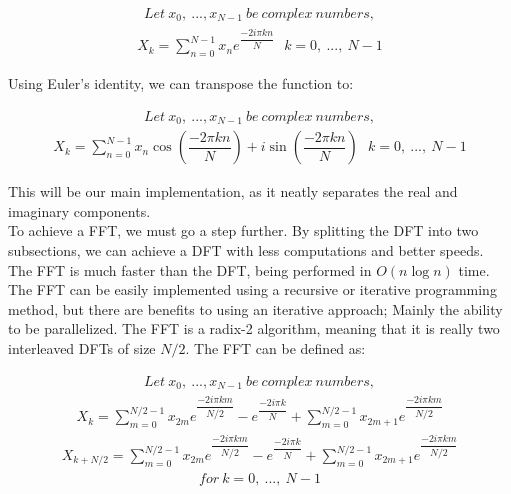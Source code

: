 \documentclass[12pt]{extarticle}
\begin{document}
	\begin{align*}
		Let\ x_{0},\ ..., x_{N-1}\ be\ complex\ numbers,
	\end{align*}
	\begin{align}
		X_{k} = \sum_{n=0}^{N-1}x_{n}e^{\dfrac{-2 i \pi k n}{N}}\ \ \ k = 0,\ ...,\ N-1
    \end{align}
   
	Using Euler's identity, we can transpose the function to:
	
	\begin{align*}
		Let\ x_{0},\ ..., x_{N-1}\ be\ complex\ numbers,
	\end{align*}
	\begin{align}
		X_{k} = \sum_{n=0}^{N-1}x_{n} \cos{(\dfrac{-2 \pi k n}{N})} + i\sin{(\dfrac{-2 \pi k n}{N})}\ \ \ k = 0,\ ...,\ N-1
    \end{align}
    
    This will be our main implementation, as it neatly separates the real and imaginary components.
   \\
   
   	To achieve a FFT, we must go a step further.
   	By splitting the DFT into two subsections, we can achieve a DFT with less computations and better speeds.
	The FFT is much faster than the DFT, being performed in $O(n\log{}n)$ time.
	The FFT can be easily implemented using a recursive or iterative programming method, but there are benefits to using an iterative approach; Mainly the ability to be parallelized.
    The FFT is a radix-2 algorithm, meaning that it is really two interleaved DFTs of size $N/2$.
    The FFT can be defined as:
    
    \begin{align*}
		Let\ x_{0},\ ..., x_{N-1}\ be\ complex\ numbers,
	\end{align*}
	\begin{align*}
		X_{k} = \sum_{m=0}^{N / 2 - 1}x_{2m}e^{\dfrac{-2 i \pi k m}{N / 2}} - e^{\dfrac{-2 i \pi k}{N}} + \sum_{m=0}^{N / 2 - 1}x_{2m + 1}e^{\dfrac{-2 i \pi k m}{N / 2}}
	\end{align*}
	\begin{align*}
		X_{k + N / 2} = \sum_{m=0}^{N / 2 - 1}x_{2m}e^{\dfrac{-2 i \pi k m}{N / 2}} - e^{\dfrac{-2 i \pi k}{N}} + \sum_{m=0}^{N / 2 - 1}x_{2m + 1}e^{\dfrac{-2 i \pi k m}{N / 2}}
	\end{align*}
	\begin{align}
		 for \ k = 0,\ ...,\ N-1
    \end{align}
    
\end{document}
